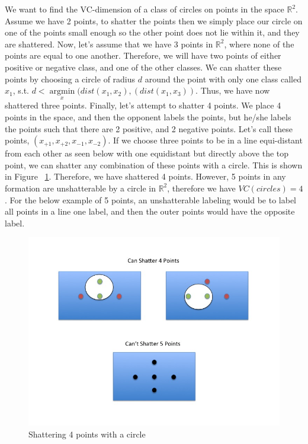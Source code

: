 \documentclass[paper=a4, fontsize=11pt]{scrartcl} %
\begin{document}
We want to find the VC-dimension of a class of circles on points in the space $\mathbb{R}^2$.  Assume we have 2 points, to shatter the points then we simply place our circle on one of the points small enough so the other point does not lie within it, and they are shattered.  Now, let's assume that we have 3 points in $\mathbb{R}^2$, where none of the points are equal to one another.  Therefore, we will have two points of either positive or negative class, and one of the other classes.  We can shatter these points by choosing a circle of radius $d$ around the point with only one class called $x_1$, s.t. $d<\underset{x}{\operatorname{argmin}}(dist(x_1,x_2),(dist(x_1,x_3))$.  Thus, we have now shattered three points. Finally, let's attempt to shatter 4 points.  We place 4 points in the space, and then the opponent labels the points, but he/she labels the points such that there are 2 positive, and 2 negative points.  Let's call these points, $(x_{+1},x_{+2},x_{-1},x_{-2})$.  If we choose three points to be in a line equi-distant from each other as seen below with one equidistant but directly above the top point, we can shatter any combination of these points with a circle. This is shown in Figure ~\ref{fig:shattering}.  Therefore, we have shattered 4 points.  However, 5 points in any formation are unshatterable by a circle in $\mathbb{R}^2$, therefore we have $VC(circles) = 4$.  For the below example of 5 points, an unshatterable labeling would be to label all points in a line one label, and then the outer points would have the opposite label.

\begin{figure}[h]
\centering
\includegraphics[scale=0.4]{Slide1.jpg}
\caption{Shattering 4 points with a circle}
\label{fig:shattering}
\end{figure}
\end{document}
